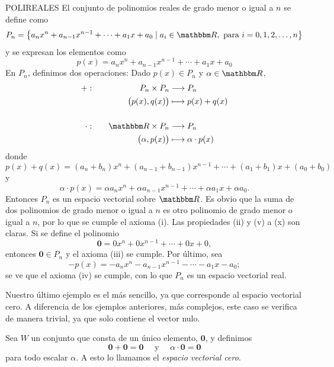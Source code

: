 \begin{examplebox}{}{POLIREALES}
    El conjunto de polinomios reales de grado menor o igual a $n$ se define como
    $$P_n = \left\{ a_nx^n + a_{n-1}x^{n-1} + \cdots + a_1x + a_0 \mid a_i \in \RR, \text{ para } i = 0, 1, 2, \dots, n \right\}$$
    y se expresan los elementos como
    $$p(x) = a_nx^n + a_{n-1}x^{n-1} + \cdots + a_1x + a_0$$
    En $P_n$, definimos dos operaciones: Dado $p(x) \in P_n$ y $\alpha \in \RR$,
    \begin{alignat*}{2}
        + & : & \quad P_n \times P_n & \longrightarrow P_n \\
        & & \big(p(x), q(x) \big) & \longmapsto p(x)+q(x) \\
        & \\
        \cdot & : & \quad \RR \times P_n & \longrightarrow P_n \\
        & & \big(\alpha, p(x) \big) & \longmapsto \alpha \cdot p(x)
    \end{alignat*}
    donde
    $$p(x) + q(x) = (a_n + b_n)x^n + (a_{n-1} + b_{n-1})x^{n-1} + \cdots + (a_1 + b_1)x + (a_0 + b_0)$$
    y
    $$\alpha \cdot p(x) = \alpha a_nx^n + \alpha a_{n-1}x^{n-1} + \cdots + \alpha a_1x + \alpha a_0.$$
    Entonces $P_n$ es un espacio vectorial sobre $\RR$. Es obvio que la suma de dos polinomios de grado menor o igual a $n$ es otro polinomio de grado menor o igual a $n$, por lo que se cumple el axioma (i). Las propiedades (ii) y (v) a (x) son claras. Si se define el polinomio
    $$\mathbf{0} = 0 x^n+0 x^{n-1} + \cdots + 0 x + 0,$$
    entonces $\mathbf{0} \in P_n$ y el axioma (iii) se cumple. Por último, sea
    $$-p(x) = -a_n x^n - a_{n-1} x^{n-1} - \cdots - a_1 x - a_0;$$
    se ve que el axioma (iv) se cumple, con lo que $P_n$ es un espacio vectorial real.
\end{examplebox}

Nuestro último ejemplo es el más sencillo, ya que corresponde al espacio vectorial cero. A diferencia de los ejemplos anteriores, más complejos, este caso se verifica de manera trivial, ya que solo contiene el vector nulo.

\begin{examplebox}{}{}
    Sea $W$ un conjunto que consta de un único elemento, $\mathbf{0}$, y definimos
    $$\mathbf{0} + \mathbf{0} = \mathbf{0} \quad \text{ y } \quad \alpha \cdot \mathbf{0} = \mathbf{0}$$
    para todo escalar $\alpha$. A esto lo llamamos el \emph{espacio vectorial cero}.
\end{examplebox}

